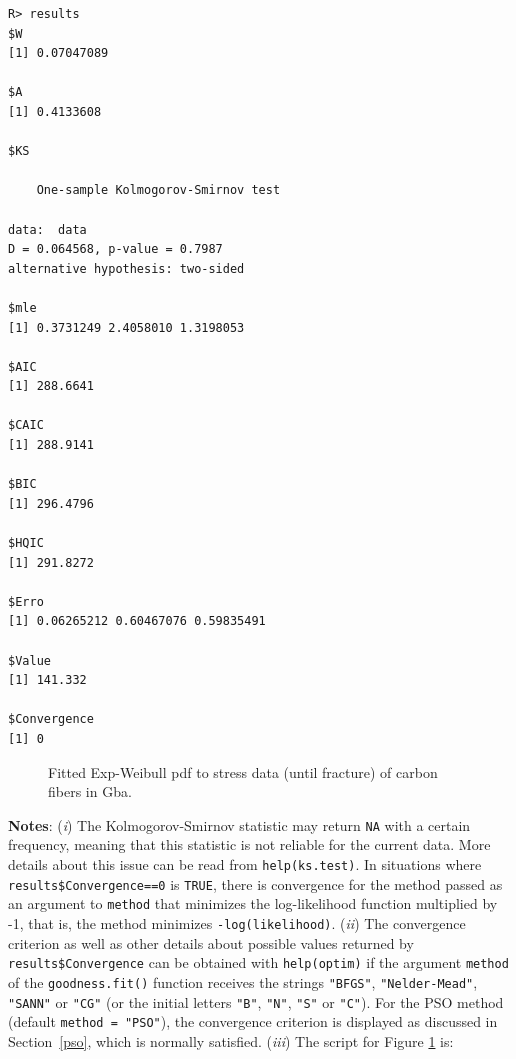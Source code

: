 \documentclass[10pt,letterpaper]{article}
\begin{document}
\begin{verbatim}
R> results
$W
[1] 0.07047089
		
$A
[1] 0.4133608
		
$KS
		
	One-sample Kolmogorov-Smirnov test
		
data:  data
D = 0.064568, p-value = 0.7987
alternative hypothesis: two-sided
		
$mle
[1] 0.3731249 2.4058010 1.3198053
		
$AIC
[1] 288.6641
		
$CAIC
[1] 288.9141
		
$BIC
[1] 296.4796
		
$HQIC
[1] 291.8272
		
$Erro
[1] 0.06265212 0.60467076 0.59835491
		
$Value
[1] 141.332
		
$Convergence
[1] 0
\end{verbatim}

\begin{figure}[H]
\centering
\caption{Fitted Exp-Weibull pdf to stress data (until fracture) of carbon fibers in Gba.}
\label{plot_ajustament}
\end{figure}


\hspace{-0.6cm}

\textbf{Notes}: ({\it i}) The Kolmogorov-Smirnov statistic may return \texttt{NA} with a certain frequency,
meaning  that this statistic is not reliable for the current data.
More details about this issue can be read from \texttt{help(ks.test)}.
In situations where \texttt{results\$Convergence==0} is \texttt{TRUE}, there is convergence for the method passed as an argument
to \texttt{method} that minimizes the log-likelihood function multiplied by -1, that is, the method minimizes \texttt{-log(likelihood)}.
({\it ii}) The convergence criterion as well as other details about possible values returned by \texttt{results\$Convergence}
can be obtained with \texttt{help(optim)} if the argument \texttt{method} of the \texttt{goodness.fit()} function receives
the strings \texttt{"BFGS"}, \texttt{"Nelder-Mead"}, \texttt{"SANN"} or \texttt{"CG"} (or the initial letters \texttt{"B"}, \texttt{"N"}, \texttt{"S"} or \texttt{"C"}).
For the PSO method  (default \texttt{method = "PSO"}), the convergence criterion is displayed as discussed in Section~\ref{pso}, which is normally  satisfied.
({\it iii}) The script for Figure \ref{plot_ajustament} is:
\end{document}
